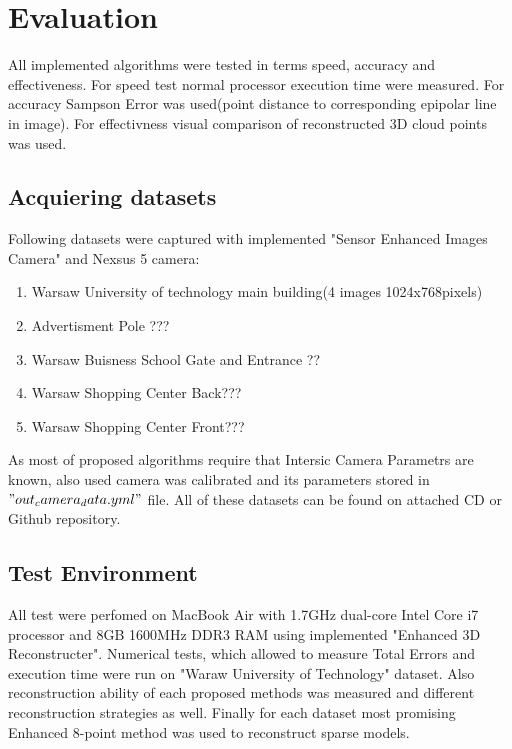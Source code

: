 
\ifpdf
    \graphicspath{{figures/}}
\else
    \graphicspath{{figures/}}
\fi


\chapter{Evaluation} %
All implemented algorithms were tested in terms speed, accuracy and effectiveness. For speed test normal processor execution time were measured. For accuracy Sampson Error was used(point distance to corresponding epipolar line in image). For effectivness visual comparison of reconstructed 3D cloud points was used.
\section{Acquiering datasets}
Following datasets were captured with implemented "Sensor Enhanced Images Camera" and Nexsus 5 camera:
\begin{enumerate}
\item Warsaw University of technology main building(4 images 1024x768pixels)
\item Advertisment Pole ??? 
\item Warsaw Buisness School Gate and Entrance ??
\item Warsaw Shopping Center Back???
\item Warsaw Shopping Center Front???
\end{enumerate}
As most of proposed algorithms require that Intersic Camera Parametrs are known, also used camera was calibrated and its parameters stored in $"out_camera_data.yml"$ file. All of these datasets can be found on attached CD or Github repository.
\section{Test Environment}
All test were perfomed on MacBook Air with 1.7GHz dual-core Intel Core i7 processor and 8GB 1600MHz DDR3 RAM using implemented "Enhanced 3D Reconstructer".  Numerical tests, which allowed to measure Total Errors and execution time were run on "Waraw University of Technology" dataset. Also  reconstruction ability of each proposed methods was measured and different reconstruction strategies as well.  Finally for each dataset most promising Enhanced 8-point method was used to reconstruct sparse models. 
